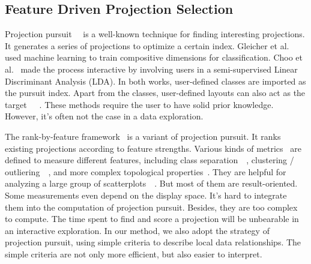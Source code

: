 \subsection{Feature Driven Projection Selection}
Projection pursuit~\cite{DBLP:journals/tc/FriedmanT74}~\cite{cook1995grand} is a well-known technique for finding interesting projections. It generates a series of projections to optimize a certain index. Gleicher et al.~\cite{DBLP:journals/tvcg/Gleicher13} used machine learning to train compositive dimensions for classification. Choo et al.~\cite{DBLP:conf/ieeevast/ChooLKP10} made the process interactive by involving users in a semi-supervised Linear Discriminant Analysis (LDA). In both works, user-defined classes are imported as the pursuit index. Apart from the classes, user-defined layouts can also act as the target~\cite{DBLP:journals/tvcg/JoiaCCPN11}~\cite{DBLP:conf/ieeevast/BrownLBC12}~\cite{DBLP:journals/tvcg/HuBMHNL13}. These methods require the user to have solid prior knowledge. However, it's often not the case in a data exploration.

The rank-by-feature framework~\cite{DBLP:journals/ivs/SeoS05} is a variant of projection pursuit. It ranks existing projections according to feature strengths. Various kinds of metrics~\cite{DBLP:conf/ieeevast/AlbuquerqueEM11} are defined to measure different features, including class separation~\cite{DBLP:journals/cgf/SipsNLH09}~\cite{DBLP:journals/cgf/SedlmairTMT12}, clustering / outliering~\cite{DBLP:conf/ieeevast/TatuAESTMK09}~\cite{DBLP:journals/tvcg/JohanssonJ09}, and more complex topological properties~\cite{DBLP:conf/infovis/WilkinsonAG05}. They are helpful for analyzing a large group of scatterplots~\cite{DBLP:conf/apvis/NhonW14}~\cite{DBLP:conf/ieeevast/AnandWN12}. But most of them are result-oriented. Some measurements even depend on the display space. It's hard to integrate them into the computation of projection pursuit. Besides, they are too complex to compute. The time spent to find and score a projection will be unbearable in an interactive exploration. In our method, we also adopt the strategy of projection pursuit, using simple criteria to describe local data relationships. The simple criteria are not only more efficient, but also easier to interpret.
